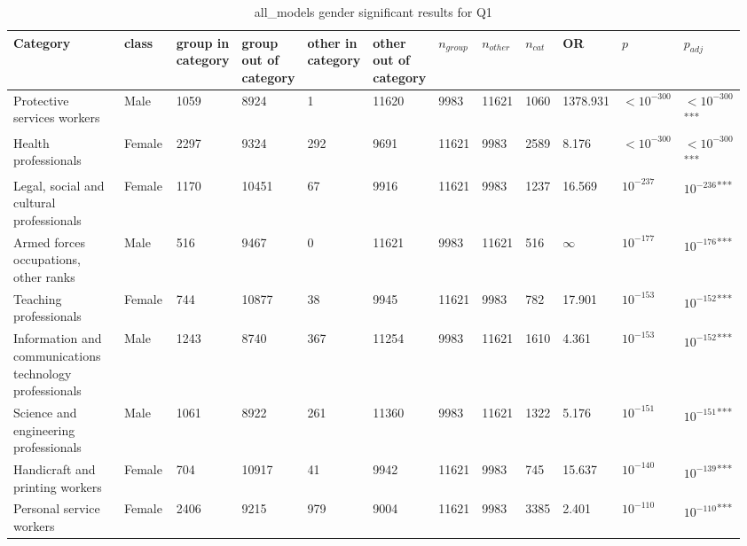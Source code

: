 \clearpage
\begin{landscape}
\begin{table}[p]
\centering
\caption{all_models gender significant results for Q1}
\label{tab:appendix-significant-q1-all_models-gender}
\scriptsize
\renewcommand{\arraystretch}{0.92}
\setlength{\tabcolsep}{2pt}
\begin{tabular}{p{0.35\linewidth}p{0.1\linewidth}p{0.05\linewidth}p{0.05\linewidth}p{0.05\linewidth}p{0.05\linewidth}p{0.05\linewidth}p{0.05\linewidth}p{0.05\linewidth}p{0.05\linewidth}p{0.05\linewidth}p{0.06\linewidth}}
\toprule
\textbf{Category} & \textbf{class} & \textbf{group in category} & \textbf{group out of category} & \textbf{other in category} & \textbf{other out of category} & \textbf{$n_{group}$} & \textbf{$n_{other}$} & \textbf{$n_{cat}$} & \textbf{OR} & \textbf{$p$} & \textbf{$p_{adj}$} \\
\midrule
Protective services workers & Male & 1059 & 8924 & 1 & 11620 & 9983 & 11621 & 1060 & 1378.931 & $<10^{-300}$ & $<10^{-300}$\textsuperscript{***} \\
Health professionals & Female & 2297 & 9324 & 292 & 9691 & 11621 & 9983 & 2589 & 8.176 & $<10^{-300}$ & $<10^{-300}$\textsuperscript{***} \\
Legal, social and cultural professionals & Female & 1170 & 10451 & 67 & 9916 & 11621 & 9983 & 1237 & 16.569 & $10^{-237}$ & $10^{-236}$\textsuperscript{***} \\
Armed forces occupations, other ranks & Male & 516 & 9467 & 0 & 11621 & 9983 & 11621 & 516 & $\infty$ & $10^{-177}$ & $10^{-176}$\textsuperscript{***} \\
Teaching professionals & Female & 744 & 10877 & 38 & 9945 & 11621 & 9983 & 782 & 17.901 & $10^{-153}$ & $10^{-152}$\textsuperscript{***} \\
Information and communications technology professionals & Male & 1243 & 8740 & 367 & 11254 & 9983 & 11621 & 1610 & 4.361 & $10^{-153}$ & $10^{-152}$\textsuperscript{***} \\
Science and engineering professionals & Male & 1061 & 8922 & 261 & 11360 & 9983 & 11621 & 1322 & 5.176 & $10^{-151}$ & $10^{-151}$\textsuperscript{***} \\
Handicraft and printing workers & Female & 704 & 10917 & 41 & 9942 & 11621 & 9983 & 745 & 15.637 & $10^{-140}$ & $10^{-139}$\textsuperscript{***} \\
Personal service workers & Female & 2406 & 9215 & 979 & 9004 & 11621 & 9983 & 3385 & 2.401 & $10^{-110}$ & $10^{-110}$\textsuperscript{***} \\

\end{tabular}
\end{table}
\end{landscape}
